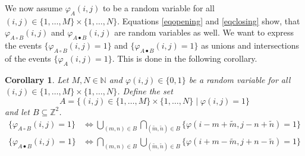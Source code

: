 \documentclass[a4paper,12pt]{article}
\theoremstyle{plain}
\newtheorem{corollary}[theorem]{Corollary}
\theoremstyle{definition}
\theoremstyle{remark}
\begin{document}
We now assume $\varphi_A(i, j)$ to be a random variable for all $(i, j) \in \{ 1, \dots, M \} \times \{ 1, \dots, N \}$. Equations \eqref{eqopening} and \eqref{eqclosing} show, that $\varphi_{A \circ B}(i, j)$ and $\varphi_{A \bullet B}(i, j)$ are random variables as well. We want to express the events $\{ \varphi_{A \circ B}(i, j) = 1 \}$ and $\{ \varphi_{A \bullet B}(i, j) = 1 \}$ as unions and intersections of the events $\{ \varphi_A(i, j) = 1 \}$. This is done in the following corollary.

\begin{corollary}
	Let $M, N \in \mathbb{N}$ and $\varphi(i, j) \in \{ 0, 1 \}$ be a random variable for all $(i, j) \in \{ 1, \dots, M \} \times \{ 1, \dots, N \}$. Define the set
	\begin{equation*}
		A = \{ (i, j) \in \{ 1, \dots, M \} \times \{ 1, \dots, N \} \mid \varphi(i, j) = 1 \}
	\end{equation*}
	and let $B \subseteq \mathbb{Z}^2$.
	\begin{align}
		\{ \varphi_{A \circ B}(i, j) = 1 \} &\Leftrightarrow \bigcup_{(m, n) \in B} \bigcap_{(\tilde{m}, \tilde{n}) \in B} \{ \varphi(i - m + \tilde{m}, j - n + \tilde{n}) = 1 \} \\
		\{ \varphi_{A \bullet B}(i, j) = 1 \} &\Leftrightarrow \bigcap_{(m, n) \in B} \bigcup_{(\tilde{m}, \tilde{n}) \in B} \{ \varphi(i + m - \tilde{m}, j + n - \tilde{n}) = 1 \}
	\end{align}
\end{corollary}
\end{document}
